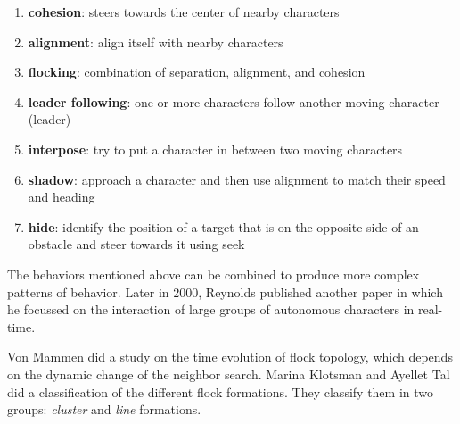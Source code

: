 \begin{enumerate}
\item \textbf{cohesion}: steers towards the center of nearby characters
\item \textbf{alignment}: align itself with nearby characters
\item \textbf{flocking}: combination of separation, alignment, and cohesion
\item \textbf{leader following}: one or more characters follow another moving character (leader)
\item \textbf{interpose}: try to put a character in between two moving characters
\item \textbf{shadow}: approach a character and then use alignment to match their speed and heading
\item \textbf{hide}: identify the position of a target that is on the opposite side of an obstacle and  steer towards it using seek
\end{enumerate} 
 
The behaviors mentioned above can be combined to produce more complex patterns of behavior. Later in 2000, Reynolds published another paper\cite{craigInteractionGroups} in which he focussed on the interaction of large groups of autonomous characters in real-time. 

Von Mammen did a study on the time evolution of flock topology, which 
depends on the dynamic change of the neighbor search\cite{spatialSwarms}. 
Marina Klotsman and Ayellet Tal  did a classification of the different flock formations\cite{lineFormations}. They classify them in two groups: \textit{cluster} and \textit{line} formations.

